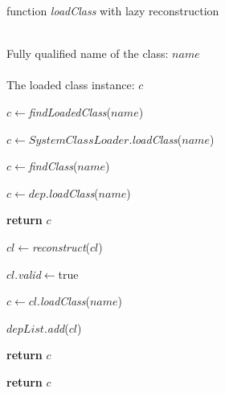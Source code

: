 \documentclass[conference]{IEEEtran}
\begin{document}
\begin{algorithm}[ht]
\caption{function \emph{loadClass} with lazy reconstruction}
\label{alg:lazy_reconstruction}
\begin{algorithmic}[1]
\REQUIRE ~~\\
Fully qualified name of the class: $name$ \\

\ENSURE ~~\\
The loaded class instance: $c$

\STATE $c\leftarrow$\emph{findLoadedClass}($name$)

	
	
		\STATE $c\leftarrow SystemClassLoader.$\emph{loadClass}($name$)
	

	

	\ELSE

		\STATE $c\leftarrow$\emph{findClass}($name$)



				\STATE $c\leftarrow dep.$\emph{loadClass}($name$)

			
					\STATE \textbf{return} $c$

				\ENDIF
			
			\ENDFOR

				


					\STATE $cl\leftarrow$\emph{reconstruct}($cl$)
				
					\STATE $cl.$\emph{valid}$\leftarrow$true

				\ENDIF

				\STATE $c\leftarrow cl.$\emph{loadClass}($name$)


					\STATE $depList$.\emph{add}($cl$)
			
					\STATE \textbf{return} $c$

				\ENDIF
			
			\ENDFOR
	
		\ENDIF

	\ENDIF

\ENDIF

\STATE \textbf{return} $c$




\end{algorithmic}
\end{algorithm}
\end{document}

